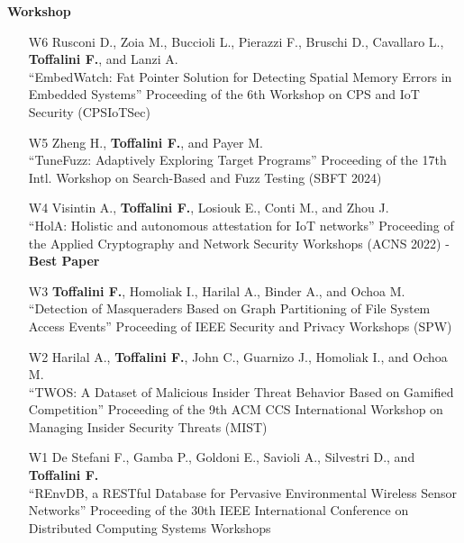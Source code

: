 \textbf{Workshop}\begin{enumerate}[leftmargin=5mm]
\item[W6] Rusconi D., Zoia M., Buccioli L., Pierazzi F., Bruschi D., Cavallaro L., \textbf{Toffalini F.}, and Lanzi A.\\``EmbedWatch: Fat Pointer Solution for Detecting Spatial Memory Errors in Embedded Systems'' Proceeding of the 6th Workshop on CPS and IoT Security (CPSIoTSec) 
\item[W5] Zheng H., \textbf{Toffalini F.}, and Payer M.\\``TuneFuzz: Adaptively Exploring Target Programs'' Proceeding of the 17th Intl. Workshop on Search-Based and Fuzz Testing (SBFT 2024) 
\item[W4]  Visintin A., \textbf{Toffalini F.}, Losiouk E., Conti M., and Zhou J.\\``HolA: Holistic and autonomous attestation for IoT networks'' Proceeding of the Applied Cryptography and Network Security Workshops (ACNS 2022)  - \textbf{Best Paper}
\item[W3] \textbf{Toffalini F.}, Homoliak I., Harilal A., Binder A., and Ochoa M.\\``Detection of Masqueraders Based on Graph Partitioning of File System Access Events'' Proceeding of IEEE Security and Privacy Workshops (SPW) 
\item[W2] Harilal A., \textbf{Toffalini F.}, John C., Guarnizo J., Homoliak I., and Ochoa M.\\``TWOS: A Dataset of Malicious Insider Threat Behavior Based on Gamified Competition'' Proceeding of the 9th ACM CCS International Workshop on Managing Insider Security Threats (MIST) 
\item[W1] De Stefani F., Gamba P., Goldoni E., Savioli A., Silvestri D., and \textbf{Toffalini F.}\\``REnvDB, a RESTful Database for Pervasive Environmental Wireless Sensor Networks'' Proceeding of the 30th IEEE International Conference on Distributed Computing Systems Workshops 
\end{enumerate}
